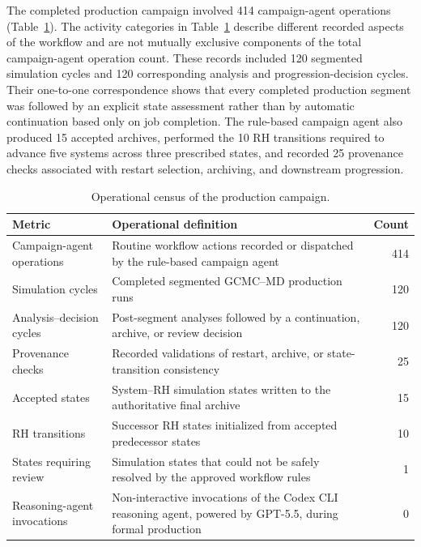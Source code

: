 The completed production campaign involved 414 campaign-agent operations (Table~\ref{tab:operation_census}). The activity categories in Table~\ref{tab:operation_census} describe different recorded aspects of the workflow and are not mutually exclusive components of the total campaign-agent operation count. These records included 120 segmented simulation cycles and 120 corresponding analysis and progression-decision cycles. Their one-to-one correspondence shows that every completed production segment was followed by an explicit state assessment rather than by automatic continuation based only on job completion. The rule-based campaign agent also produced 15 accepted archives, performed the 10 RH transitions required to advance five systems across three prescribed states, and recorded 25 provenance checks associated with restart selection, archiving, and downstream progression.

\begin{table}[t]
\centering
\small
\caption{Operational census of the production campaign.}
\label{tab:operation_census}
\begin{tabular}{p{3.6cm}p{9.0cm}r}
\toprule
Metric & Operational definition & Count \\
\midrule
Campaign-agent operations & Routine workflow actions recorded or dispatched by the rule-based campaign agent & 414 \\
Simulation cycles & Completed segmented GCMC--MD production runs & 120 \\
Analysis--decision cycles & Post-segment analyses followed by a continuation, archive, or review decision & 120 \\
Provenance checks & Recorded validations of restart, archive, or state-transition consistency & 25 \\
Accepted states & System--RH simulation states written to the authoritative final archive & 15 \\
RH transitions & Successor RH states initialized from accepted predecessor states & 10 \\
States requiring review & Simulation states that could not be safely resolved by the approved workflow rules & 1 \\
Reasoning-agent invocations & Non-interactive invocations of the Codex CLI reasoning agent, powered by GPT-5.5, during formal production & 0 \\
\bottomrule
\end{tabular}
\end{table}

